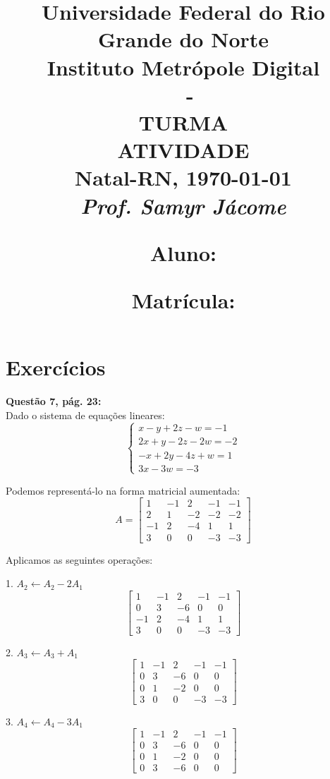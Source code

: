 \documentclass[a4paper,12pt]{article}
\author{}
\date{}
\title{
\vspace{-2cm}
\Large \textbf{Universidade Federal do Rio Grande do Norte}\\ 
Instituto Metrópole Digital \\ 
\coddisciplina $\;$ - \nomedisciplina \\ 
TURMA \codturma \\
\vspace{5mm} \Large\textbf{ATIVIDADE \codatividade} \\
\normalsize Natal-RN, \today\\
\vspace{0.7cm} \large \textit{Prof. Samyr Jácome}\\

\justifying
\vspace{0.5cm} \hspace{-0.82cm}
\begin{minipage}{.6\linewidth}
    \large \textbf{Aluno:} \nomedoaluno
\end{minipage}
\begin{minipage}{.4\linewidth}
    \begin{flushright}
        \large \textbf{Matrícula:} \matricula
    \end{flushright}
\end{minipage}
}
\def\tirarident{\setlength{\parindent}{0cm}} %
\begin{document}
\maketitle

\vspace{-2cm}
\section*{Exercícios}

\tirarident

\textbf{Questão 7, pág. 23:}\\

Dado o sistema de equações lineares:
\[
\begin{cases}
x - y + 2z - w = -1 \\
2x + y - 2z - 2w = -2 \\
- x + 2y - 4z + w = 1 \\
3x - 3w = -3
\end{cases}
\]

Podemos representá-lo na forma matricial aumentada:
\[
A =
\begin{bmatrix}
1 & -1 & 2 & -1 & -1 \\
2 & 1 & -2 & -2 & -2 \\
-1 & 2 & -4 & 1 & 1 \\
3 & 0 & 0 & -3 & -3
\end{bmatrix}
\]

Aplicamos as seguintes operações:

1. \( A_2 \leftarrow A_2 - 2A_1 \)
\[
\begin{bmatrix}
1 & -1 & 2 & -1 & -1 \\
0 & 3 & -6 & 0 & 0 \\
-1 & 2 & -4 & 1 & 1 \\
3 & 0 & 0 & -3 & -3
\end{bmatrix}
\]

2. \( A_3 \leftarrow A_3 + A_1 \)
\[
\begin{bmatrix}
1 & -1 & 2 & -1 & -1 \\
0 & 3 & -6 & 0 & 0 \\
0 & 1 & -2 & 0 & 0 \\
3 & 0 & 0 & -3 & -3
\end{bmatrix}
\]

3. \( A_4 \leftarrow A_4 - 3A_1 \)
\[
\begin{bmatrix}
1 & -1 & 2 & -1 & -1 \\
0 & 3 & -6 & 0 & 0 \\
0 & 1 & -2 & 0 & 0 \\
0 & 3 & -6 & 0 & 0
\end{bmatrix}
\]
\end{document}

